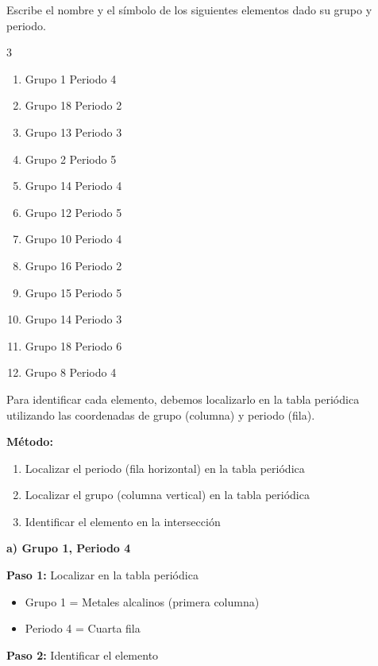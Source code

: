 \begin{exercise}
    Escribe el nombre y el símbolo de los siguientes elementos dado su grupo y periodo.
    \begin{multicols}{3}
        \begin{enumerate}[label=\letraminuscula]
        \item Grupo 1 Periodo 4
        \item Grupo 18 Periodo 2
        \item Grupo 13 Periodo 3
        \item Grupo 2 Periodo 5
        \item Grupo 14 Periodo 4
        \item Grupo 12 Periodo 5
        \item Grupo 10 Periodo 4
        \item Grupo 16 Periodo 2
        \item Grupo 15 Periodo 5
        \item Grupo 14 Periodo 3
        \item Grupo 18 Periodo 6
        \item Grupo 8 Periodo 4
        \end{enumerate}
    \end{multicols}
    \begin{solu}
        Para identificar cada elemento, debemos localizarlo en la tabla periódica utilizando las coordenadas de grupo (columna) y periodo (fila).

        \textbf{Método:}
        \begin{enumerate}
            \item Localizar el periodo (fila horizontal) en la tabla periódica
            \item Localizar el grupo (columna vertical) en la tabla periódica
            \item Identificar el elemento en la intersección
        \end{enumerate}

        \textbf{a) Grupo 1, Periodo 4}

        \textbf{Paso 1:} Localizar en la tabla periódica
        \begin{itemize}
            \item Grupo 1 = Metales alcalinos (primera columna)
            \item Periodo 4 = Cuarta fila
        \end{itemize}

        \textbf{Paso 2:} Identificar el elemento


\end{solu}
\end{exercise}

